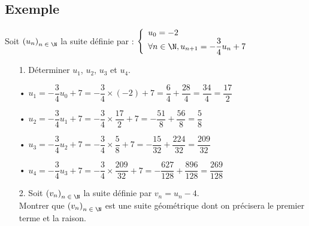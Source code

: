 \newpage

\subsection{Exemple }

Soit $\left(u_n\right)_{n\; \in \; \N}$ la suite définie par : $\left\{
  \begin{array}{lll}
    u_0 = -2 \\
    \forall n \in \N, u_{n+1} = -\dfrac{3}{4}u_n + 7
  \end{array}
\right.$

\vspace*{.3cm}

\begin{itemize}
\item[1.] Déterminer $u_1$, $u_2$, $u_3$ et $u_4$. \\
\end{itemize}

\begin{itemize}
\item[•] $u_1 = -\dfrac{3}{4}u_0 + 7 = -\dfrac{3}{4} \times \left(-2\right) + 7 = \dfrac{6}{4} + \dfrac{28}{4} = \dfrac{34}{4} = \dfrac{17}{2}$ \vspace*{.3cm} \\
\item[•] $u_2 = -\dfrac{3}{4}u_1 + 7 = -\dfrac{3}{4} \times \dfrac{17}{2} + 7 = -\dfrac{51}{8} + \dfrac{56}{8} = \dfrac{5}{8}$ \vspace*{.3cm} \\
\item[•] $u_3 = -\dfrac{3}{4}u_2 + 7 = -\dfrac{3}{4} \times \dfrac{5}{8} + 7 = -\dfrac{15}{32} + \dfrac{224}{32} = \dfrac{209}{32}$ \vspace*{.3cm} \\ 
\item[•] $u_4 = -\dfrac{3}{4}u_3 + 7 = -\dfrac{3}{4} \times \dfrac{209}{32} + 7 = -\dfrac{627}{128} + \dfrac{896}{128} = \dfrac{269}{128}$ \\ 
\end{itemize}

\vspace*{.3cm}

\begin{itemize}
\item[2.] Soit $\left(v_n\right)_{n\; \in \; \N}$ la suite définie par $v_n =u_n - 4$. \\ Montrer que $\left(v_n\right)_{n\; \in \; \N}$ est une suite géométrique dont on précisera le premier terme et la raison.
\end{itemize}

